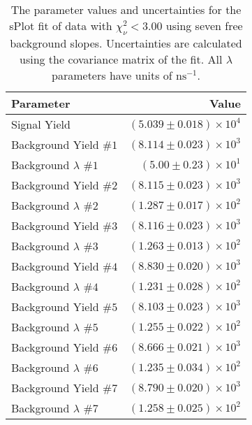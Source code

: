 
\begin{table}[ht]
    \begin{center}
        \begin{tabular}{lr}\toprule
            Parameter & Value \\\midrule
            Signal Yield & $(5.039 \pm 0.018) \times 10^{4}$ \\
            Background Yield $\#1$ & $(8.114 \pm 0.023) \times 10^{3}$ \\
            Background $\lambda$ $\#1$ & $(5.00 \pm 0.23) \times 10^{1}$ \\
            Background Yield $\#2$ & $(8.115 \pm 0.023) \times 10^{3}$ \\
            Background $\lambda$ $\#2$ & $(1.287 \pm 0.017) \times 10^{2}$ \\
            Background Yield $\#3$ & $(8.116 \pm 0.023) \times 10^{3}$ \\
            Background $\lambda$ $\#3$ & $(1.263 \pm 0.013) \times 10^{2}$ \\
            Background Yield $\#4$ & $(8.830 \pm 0.020) \times 10^{3}$ \\
            Background $\lambda$ $\#4$ & $(1.231 \pm 0.028) \times 10^{2}$ \\
            Background Yield $\#5$ & $(8.103 \pm 0.023) \times 10^{3}$ \\
            Background $\lambda$ $\#5$ & $(1.255 \pm 0.022) \times 10^{2}$ \\
            Background Yield $\#6$ & $(8.666 \pm 0.021) \times 10^{3}$ \\
            Background $\lambda$ $\#6$ & $(1.235 \pm 0.034) \times 10^{2}$ \\
            Background Yield $\#7$ & $(8.790 \pm 0.020) \times 10^{3}$ \\
            Background $\lambda$ $\#7$ & $(1.258 \pm 0.025) \times 10^{2}$ \\\bottomrule
        \end{tabular}
        \caption{The parameter values and uncertainties for the sPlot fit of data with $\chi^2_\nu < 3.00$ using seven free background slopes. Uncertainties are calculated using the covariance matrix of the fit. All $\lambda$ parameters have units of $\si{\nano\second}^{-1}$.}\label{tab:splot-fit-results-chisqdof-3.00-free-7}
    \end{center}
\end{table}

